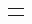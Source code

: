 \begin{adjustwidth}{-3em}{-3em}
\begin{longtable}{l}%
\scriptsize
%                                                                                          


\end{longtable}
\end{adjustwidth}
